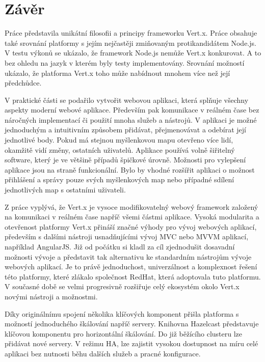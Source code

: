
\chapter[Závěr]{Závěr}

Práce představila unikátní filosofii a principy frameworku Vert.x. Práce obsahuje také srovnání platformy s jejím nejčastěji zmiňovaným protikandidátem Node.js. V testu výkonů se ukázalo, že framework Node.js nemůže Vert.x konkurovat. A to bez ohledu na jazyk v kterém byly testy implementovány. Srovnání možností ukázalo, že platforma Vert.x toho může nabídnout mnohem více než její předchůdce. 

V praktické části se podařilo vytvořit webovou aplikaci, která splňuje všechny aspekty moderní webové aplikace. Především pak komunikace v reálném čase bez náročných implementací či použití mnoha služeb a nástrojů. V aplikaci je možné jednoduchým a intuitivním způsobem přidávat, přejmenovávat a odebírat její jednotlivé body. Pokud má stejnou myšlenkovou mapu otevřeno více lidí, okamžitě vidí změny, ostatních uživatelů. Aplikace používá volně šiřitelný software, který je ve většině případů špičkové úrovně. %
Možnosti pro vylepšení aplikace jsou na straně funkcionální. Bylo by vhodné rozšířit aplikaci o možnost přihlášení a správy pouze svých myšlenkových map nebo případné sdílení jednotlivých map s ostatními uživateli.

Z práce vyplývá, že Vert.x je vysoce modifikovatelný webový framework založený na komunikaci v reálném čase napříč všemi částmi aplikace. Vysoká modularita a otevřenost platformy Vert.x přináší značné výhody pro vývoj webových aplikací, především s dalšími nástroji usnadňujícími vývoj MVC nebo MVVM aplikací, například AngularJS. Již od počátku si kladl za cíl zjednodušit dosavadní možnosti vývoje a představit tak alternativu ke standardním nástrojům vývoje webových aplikací. Je to právě jednoduchost, univerzálnost a komplexnost řešení této platformy, které zlákalo společnost RedHat, která adoptovala tuto platformu. V současné době se velmi progresivně rozšiřuje celý ekosystém okolo Vert.x novými nástroji a možnostmi. 

Díky originálnímu spojení několika klíčových komponent přišla platforma s možností jednoduchého škálování napříč servery. Knihovna Hazelcast představuje klíčovou komponentu pro horizontální škálování. Do již běžícího clusteru lze přidávat nové servery. V režimu HA, lze zajistit vysokou dostupnost na míru celé aplikaci bez nutnosti běhu dalších služeb a pracné konfigurace.

